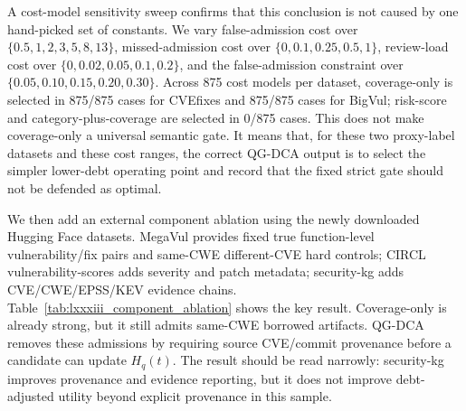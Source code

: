 ﻿\documentclass[lettersize,journal]{IEEEtran}
\begin{document}
A cost-model sensitivity sweep confirms that this conclusion is not caused by one hand-picked set of constants. We vary false-admission cost over $\{0.5,1,2,3,5,8,13\}$, missed-admission cost over $\{0,0.1,0.25,0.5,1\}$, review-load cost over $\{0,0.02,0.05,0.1,0.2\}$, and the false-admission constraint over $\{0.05,0.10,0.15,0.20,0.30\}$. Across 875 cost models per dataset, coverage-only is selected in 875/875 cases for CVEfixes and 875/875 cases for BigVul; risk-score and category-plus-coverage are selected in 0/875 cases. This does not make coverage-only a universal semantic gate. It means that, for these two proxy-label datasets and these cost ranges, the correct QG-DCA output is to select the simpler lower-debt operating point and record that the fixed strict gate should not be defended as optimal.

We then add an external component ablation using the newly downloaded Hugging Face datasets. MegaVul provides fixed true function-level vulnerability/fix pairs and same-CWE different-CVE hard controls; CIRCL vulnerability-scores adds severity and patch metadata; security-kg adds CVE/CWE/EPSS/KEV evidence chains. Table~\ref{tab:lxxxiii_component_ablation} shows the key result. Coverage-only is already strong, but it still admits same-CWE borrowed artifacts. QG-DCA removes these admissions by requiring source CVE/commit provenance before a candidate can update $H_q(t)$. The result should be read narrowly: security-kg improves provenance and evidence reporting, but it does not improve debt-adjusted utility beyond explicit provenance in this sample.

\begin{table}[!t]
\caption{LXXXIII external component ablation on MegaVul same-CWE controls}
\label{tab:lxxxiii_component_ablation}
\centering
\scriptsize
\renewcommand{\arraystretch}{1.12}
\end{table}
\end{document}
